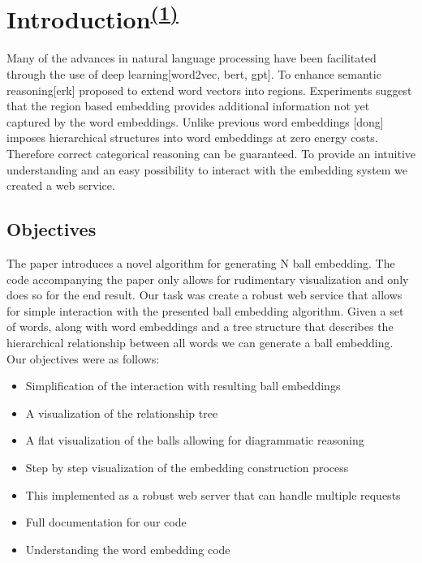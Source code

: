 \chapter[Introduction]{Introduction\textsuperscript{\hyperref[Jan]{(1)}}}

Many of the advances in natural language processing have been facilitated through the use of deep learning[word2vec, bert, gpt]. To enhance semantic reasoning[erk] proposed to extend word vectors into regions. Experiments suggest that the region based embedding provides additional information not yet captured by the word embeddings. Unlike previous word embeddings [dong] imposes hierarchical structures into word embeddings at zero energy costs. Therefore correct categorical reasoning can be guaranteed. To provide an intuitive understanding and an easy possibility to interact with the embedding system we created a web service. 

\section{Objectives}
\label{objectives}
The paper \cite{dong2018encoding} introduces a novel algorithm for generating N ball embedding. The code accompanying the paper only allows for rudimentary visualization and only does so for the end result. Our task was create a robust web service that allows for simple interaction with the presented ball embedding algorithm. 
Given a set of words, along with word embeddings and a tree structure that describes the hierarchical relationship between all words we can generate a ball embedding. \\

Our objectives were as follows:
\begin{itemize}
	\item Simplification of the interaction with resulting ball embeddings
	\item A visualization of the relationship tree
	\item A flat visualization of the balls allowing for diagrammatic reasoning
	\item Step by step visualization of the embedding construction process
	\item This implemented as a robust web server that can handle multiple requests
	\item Full documentation for our code
	\item Understanding the word embedding code
\end{itemize}


